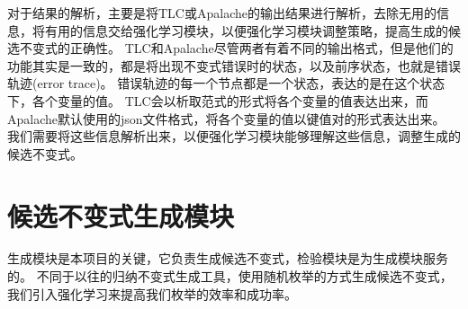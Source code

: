 对于结果的解析，主要是将TLC或Apalache的输出结果进行解析，去除无用的信息，将有用的信息交给强化学习模块，以便强化学习模块调整策略，提高生成的候选不变式的正确性。
TLC和Apalache尽管两者有着不同的输出格式，但是他们的功能其实是一致的，都是将出现不变式错误时的状态，以及前序状态，也就是错误轨迹(error trace)。
错误轨迹的每一个节点都是一个状态，表达的是在这个状态下，各个变量的值。
TLC会以析取范式的形式将各个变量的值表达出来，而Apalache默认使用的json文件格式，将各个变量的值以键值对的形式表达出来。
我们需要将这些信息解析出来，以便强化学习模块能够理解这些信息，调整生成的候选不变式。


\section{候选不变式生成模块}

生成模块是本项目的关键，它负责生成候选不变式，检验模块是为生成模块服务的。
不同于以往的归纳不变式生成工具，使用随机枚举的方式生成候选不变式，我们引入强化学习来提高我们枚举的效率和成功率。


